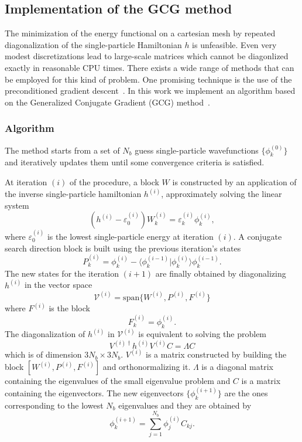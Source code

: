 \documentclass[%
 reprint, linenumbers,
 amsmath,amssymb,
 aps, physrev
]{revtex4-2}
\begin{document}
\subsection{\label{sec:gcg}Implementation of the GCG method}
The minimization of the energy functional on a cartesian mesh by repeated diagonalization of the single-particle Hamiltonian $h$ is unfeasible. Even very modest discretizations lead to large-scale matrices which cannot be diagonlized exactly in reasonable CPU times. There exists a wide range of methods that can be employed for this kind of problem. One promising technique is the use of the preconditioned gradient descent~\cite{ryssens_numerical, covariant_lobpcg}. In this work we implement an algorithm based on the Generalized Conjugate Gradient (GCG) method~\cite{gcg1, gcg2}.

\subsubsection{Algorithm}
The method starts from a set of $N_b$ guess single-particle wavefunctions $\{\phi_k^{(0)}\}$ and iteratively updates them until some convergence criteria is satisfied.

At iteration $(i)$ of the procedure, a block $W$ is constructed by an application of the inverse single-particle hamiltonian $h^{(i)}$, approximately solving the linear system
\begin{equation}
    (h^{(i)}-\varepsilon_0^{(i)})W^{(i)}_k = \varepsilon^{(i)}_k\phi_k^{(i)},
\end{equation}
where $\varepsilon_0^{(i)}$ is the lowest single-particle energy at iteration $(i)$.
A conjugate search direction block is built using the previous iteration's states
\begin{equation}
P_k^{(i)} = \phi^{(i)}_k - \langle\phi_k^{(i-1)}| \phi_k^{(i)}\rangle\phi_k^{(i-1)}.
\end{equation}
The new states for the iteration $(i+1)$ are finally obtained by diagonalizing $h^{(i)}$ in the vector space
\begin{equation}\mathcal V^{(i)}=\text{span}\{W^{(i)}, P^{(i)}, F^{(i)}\}
\end{equation}
where $F^{(i)}$ is the block 
\begin{equation}
F_k^{(i)} = \phi_k^{(i)}.
\end{equation}
The diagonalization of $h^{(i)}$ in $\mathcal V^{(i)}$ is equivalent to solving the problem
\begin{equation}
  V^{(i)\dagger} h^{(i)} V^{(i)}C = \Lambda C
\end{equation}
which is of dimension $3N_b\times 3N_b$. $V^{(i)}$ is a matrix constructed by building the block $[W^{(i)}, P^{(i)}, F^{(i)}]$ and orthonormalizing it. $\Lambda$ is a diagonal matrix containing the eigenvalues of the small eigenvalue problem and $C$ is a matrix containing the eigenvectors.
The new eigenvectors $\{\phi_k^{(i+1)}\}$ are the ones corresponding to the lowest $N_b$ eigenvalues and they are obtained by
\begin{equation}
  \phi_k^{(i+1)} = \sum_{j=1}^{N_b} \phi_j^{(i)}C_{kj}.
\end{equation}
\end{document}
